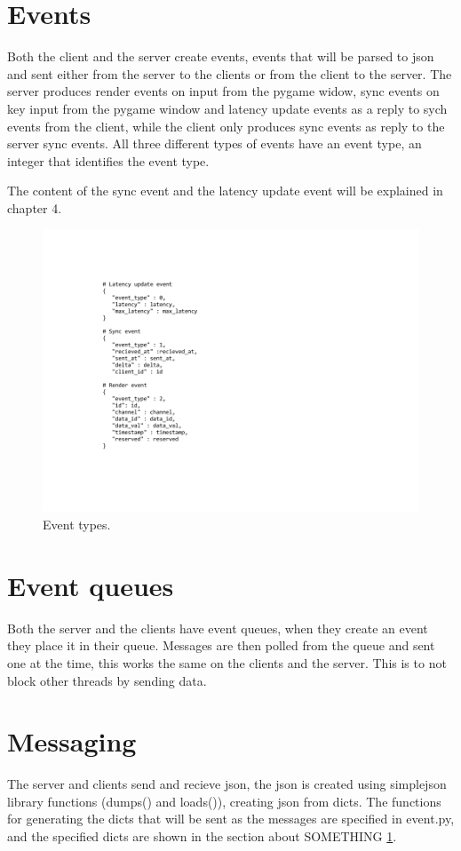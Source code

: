\section{Events}
Both the client and the server create events, events that will be parsed to json and sent either from the server to the clients or from the client to the server. The server produces render events on input from the pygame widow, sync events on key input from the pygame window and latency update events as a reply to sych events from the client, while the client only produces sync events as reply to the server sync events. All three different types of events have an event type, an integer that identifies the event type.

The content of the sync event and the latency update event will be explained in chapter 4. 

\begin{figure}[h!]
\centering
\includegraphics[width=1.3\textwidth]{figures/events.png}
\caption{Event types.}
\label{events}
\end{figure}

\section{Event queues}
Both the server and the clients have event queues, when they create an event they place it in their queue. Messages are then polled from the queue and sent one at the time, this works the same on the clients and the server. This is to not block other threads by sending data. 

\section{Messaging}
The server and clients send and recieve json, the json is created using simplejson library functions (dumps() and loads()), creating json from dicts. The functions for generating the dicts that will be sent as the messages are specified in event.py, and the specified dicts are shown in the section about SOMETHING \ref{events}. 

